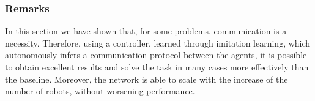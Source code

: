 \subsubsection{Remarks}
\label{subsubsec:remarks-task2-comm}

In this section we have shown that, for some problems, communication is a 
necessity. 
Therefore, using a controller, learned through imitation learning, which 
autonomously infers a communication protocol between the agents, it is possible 
to obtain excellent results and solve the task in many cases more effectively than 
the baseline.
Moreover, the network is able to scale with the increase of the number of robots, 
without worsening performance.
